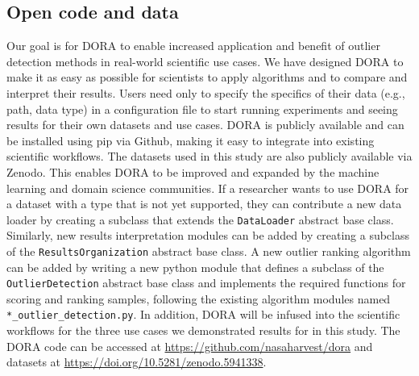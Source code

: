 \documentclass[utf8]{frontiersFPHY} %
\begin{document}
\subsection{Open code and data} 
Our goal is for DORA to enable increased application and benefit of
outlier detection methods in real-world scientific use cases. We have 
designed DORA to make it as easy as possible for scientists to apply
algorithms and to compare and interpret their results. Users need only
to specify the specifics of their data (e.g., path, data type) in a 
configuration file to start running experiments and seeing results for 
their own datasets and use cases. DORA is
publicly available and can be installed using pip via Github, making it
easy to integrate into existing scientific workflows. 
The datasets used in this study are also publicly available via Zenodo. 
This enables DORA to be improved and expanded by the 
machine learning and domain science communities. 
If a researcher wants to use DORA for a dataset with a type that is not yet
supported, they can contribute a new data loader by creating a subclass
that extends the \texttt{DataLoader} abstract base class. Similarly, new 
results interpretation modules can be added by creating a subclass of the 
\texttt{ResultsOrganization} abstract base class. A new outlier ranking
algorithm can be added by writing a new python module that defines
a subclass of the \texttt{OutlierDetection} abstract base class and implements 
the required functions for scoring and ranking samples, following the 
existing algorithm modules named \texttt{*\_outlier\_detection.py}.
In addition, DORA will be infused into the scientific workflows for the
three use cases we demonstrated results for in this study.
The DORA code can be accessed at
\url{https://github.com/nasaharvest/dora} and datasets 
at \url{https://doi.org/10.5281/zenodo.5941338}.
\end{document}
